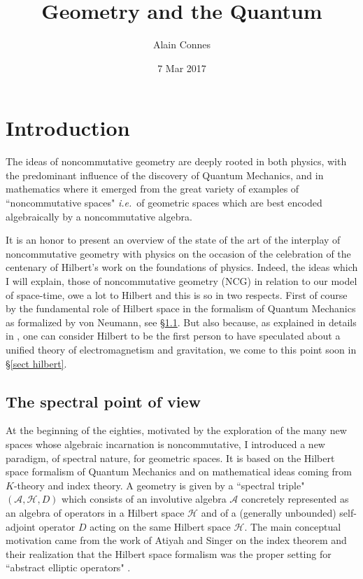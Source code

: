 \documentclass[12pt]{article}
\def\cA{{\mathcal A}}
\def\cH{{\mathcal H}}
\newcommand{\ie}{{\it i.e.\/}\ }
\begin{document}
\title{Geometry and the Quantum}
\author{Alain Connes}
\date{7 Mar 2017}
\maketitle

\newpage
\tableofcontents 
\newpage

\section{Introduction}
The ideas of noncommutative geometry are deeply rooted in both physics, with the predominant influence of the discovery of Quantum Mechanics, and in mathematics where it emerged from the great variety of examples of ``noncommutative spaces" \ie of geometric spaces which are best encoded algebraically  by a  noncommutative algebra. 


It is an honor  to present an overview of the state of the art of the interplay of noncommutative geometry with physics on the occasion of the celebration of the centenary of Hilbert's work on the foundations of  physics.
Indeed, the ideas which I will  explain, those of noncommutative geometry (NCG) in relation to our model of space-time, owe a lot to Hilbert and this is so in two respects. First of course by the fundamental role of Hilbert space in the formalism of Quantum Mechanics as formalized by von Neumann, see \S \ref{spec sect}. But also because,  
as explained in details in \cite{corry,KS}, one can consider Hilbert to be   the first person to have speculated about a unified theory of electromagnetism and gravitation, we come to this point soon in \S \ref{sect hilbert}.


\subsection{The spectral point of view}\label{spec sect}
At the beginning of the eighties, motivated by the exploration of the many new spaces whose algebraic incarnation is noncommutative, I introduced a new paradigm, of spectral nature, for geometric spaces. It is based on the Hilbert space formalism of Quantum Mechanics and on mathematical ideas coming from $K$-theory and index theory. A geometry is given by a ``spectral triple" $(\cA,\cH,D)$ which consists of an involutive algebra $\cA$ concretely represented as an algebra of operators in a Hilbert space $\cH$ and of a (generally unbounded) self-adjoint operator $D$ acting on the same Hilbert space $\cH$. The main conceptual motivation came from the work of Atiyah and Singer on the index theorem and their realization that the Hilbert space formalism was the proper setting for ``abstract elliptic operators" \cite{Atiyah}.
\end{document}
